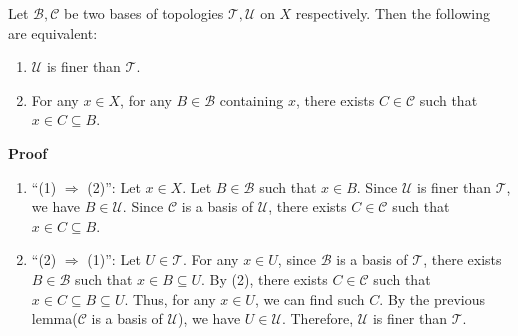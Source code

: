 \documentclass[main.tex]{subfiles}
\begin{document}
\begin{lemma}
    Let $\mathcal{B}, \mathcal{C}$ be two bases of topologies $\mathcal{T}, \mathcal{U}$ on $X$ respectively. Then the following are equivalent:
    \begin{enumerate}
        \item $\mathcal{U}$ is finer than $\mathcal{T}$. 
        \item For any $x \in X$, for any $B \in \mathcal{B}$ containing $x$, there exists $C \in \mathcal{C}$ such that $x \in C \subseteq B$.
    \end{enumerate}
\end{lemma}

\par \noindent \textbf{Proof} 
\begin{enumerate}
    \item ``(1) $\Rightarrow$ (2)'': Let $x \in X$. Let $B \in \mathcal{B}$ such that $x \in B$. Since $\mathcal{U}$ is finer than $\mathcal{T}$, we have $B \in \mathcal{U}$. Since $\mathcal{C}$ is a basis of $\mathcal{U}$, there exists $C \in \mathcal{C}$ such that $x \in C \subseteq B$.
    \item ``(2) $\Rightarrow$ (1)'': Let $U \in \mathcal{T}$. For any $x \in U$, since $\mathcal{B}$ is a basis of $\mathcal{T}$, there exists $B \in \mathcal{B}$ such that $x \in B \subseteq U$. By (2), there exists $C \in \mathcal{C}$ such that $x \in C \subseteq B \subseteq U$. Thus, for any $x \in U$, we can find such $C$. By the previous lemma($\mathcal{C}$ is a basis of $\mathcal{U}$), we have $U \in \mathcal{U}$. Therefore, $\mathcal{U}$ is finer than $\mathcal{T}$.
\end{enumerate}
\end{document}
